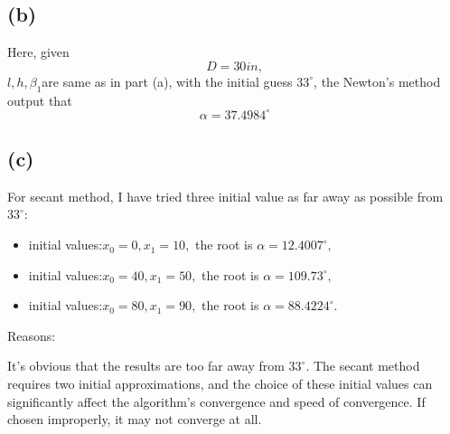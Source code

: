 \documentclass[a4paper]{article}
\begin{document}
\subsection*{(b)}
Here, given $$D = 30 in,$$ $l,h,\beta_1$are same as in part (a), with the initial guess $33^{\circ}$, the Newton's method output that
$$\alpha = 37.4984^{\circ} $$
\subsection*{(c)}
For secant method, I have tried three initial value as far away as possible from $33^{\circ}$:
\begin{itemize}  
  \item initial values:$x_0 = 0 , x_1 = 10,$ the root is $\alpha = 12.4007^{\circ},$  
  \item initial values:$x_0 = 40 , x_1 = 50,$ the root is $\alpha = 109.73^{\circ},$   
  \item initial values:$x_0 = 80 , x_1 = 90,$ the root is $\alpha = 88.4224^{\circ}.$  
\end{itemize}  
Reasons:

It's obvious that the results are too far away from $33^{\circ}.$ The secant method requires two initial approximations, 
and the choice of these initial values can significantly affect the algorithm's convergence and speed of convergence. If chosen improperly, it may not converge at all.
\end{document}
